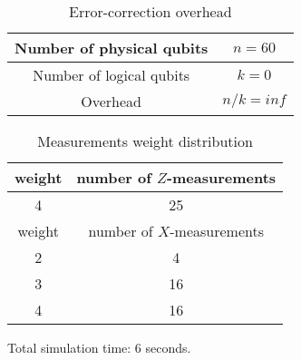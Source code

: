 \documentclass[12pt]{article}
\begin{document}
\newpage
\begin{table}[h]
\centering
\begin{tabular}{c c}
\hline
Number of physical qubits & $n = 60$ \\
\hline
Number of logical qubits & $k = 0$\\
\hline
Overhead & $n/k = inf$\\
\hline
\end{tabular}
\caption{Error-correction overhead}
\end{table}
\vspace{.3cm}


\begin{table}[h]
\centering
\begin{tabular}{c c}
\hline
weight & number of $Z$-measurements\\
\hline
4 & 25\\
\hline
\hline
weight & number of $X$-measurements\\
\hline
2 & 4\\
3 & 16\\
4 & 16\\
\hline
\end{tabular}
\caption{Measurements weight distribution}
\end{table}
\vspace{.3cm}



\vspace{2cm}
Total simulation time: $6$ seconds.
\end{document}
